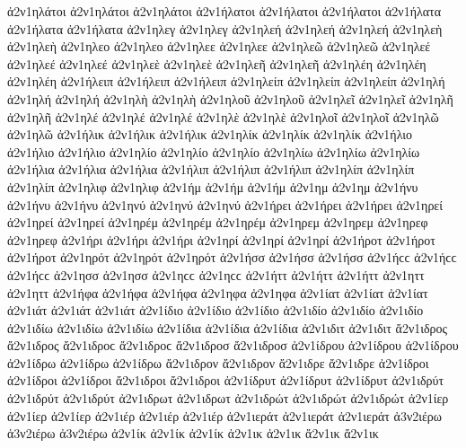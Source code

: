 {ἀ2ν1ηλάτοι ἀ2ν1ηλάτοι ἀ2ν1ηλάτοι 
ἀ2ν1ήλατοι ἀ2ν1ήλατοι ἀ2ν1ήλατοι 
ἀ2ν1ήλατα ἀ2ν1ήλατα ἀ2ν1ήλατα 
ἀ2ν1ηλεγ ἀ2ν1ηλεγ   %
ἀ2ν1ηλεή ἀ2ν1ηλεή ἀ2ν1ηλεή   %
ἀ2ν1ηλεὴ ἀ2ν1ηλεὴ 
ἀ2ν1ηλεο ἀ2ν1ηλεο 
ἀ2ν1ηλεε ἀ2ν1ηλεε 
ἀ2ν1ηλεῶ ἀ2ν1ηλεῶ 
ἀ2ν1ηλεέ ἀ2ν1ηλεέ ἀ2ν1ηλεέ 
ἀ2ν1ηλεὲ ἀ2ν1ηλεὲ 
ἀ2ν1ηλεῆ ἀ2ν1ηλεῆ 
ἀ2ν1ηλέη ἀ2ν1ηλέη ἀ2ν1ηλέη   %
ἀ2ν1ήλειπ ἀ2ν1ήλειπ ἀ2ν1ήλειπ   %
ἀ2ν1ηλείπ ἀ2ν1ηλείπ ἀ2ν1ηλείπ 
ἀ2ν1ηλή ἀ2ν1ηλή ἀ2ν1ηλή   %
ἀ2ν1ηλὴ ἀ2ν1ηλὴ 
ἀ2ν1ηλοῦ ἀ2ν1ηλοῦ 
ἀ2ν1ηλεῖ ἀ2ν1ηλεῖ 
ἀ2ν1ηλῆ ἀ2ν1ηλῆ 
ἀ2ν1ηλέ ἀ2ν1ηλέ ἀ2ν1ηλέ 
ἀ2ν1ηλὲ ἀ2ν1ηλὲ 
ἀ2ν1ηλοῖ ἀ2ν1ηλοῖ 
ἀ2ν1ηλῶ ἀ2ν1ηλῶ 
ἀ2ν1ήλικ ἀ2ν1ήλικ ἀ2ν1ήλικ   %
ἀ2ν1ηλίκ ἀ2ν1ηλίκ ἀ2ν1ηλίκ 
ἀ2ν1ήλιο ἀ2ν1ήλιο ἀ2ν1ήλιο   %
ἀ2ν1ηλίο ἀ2ν1ηλίο ἀ2ν1ηλίο 
ἀ2ν1ηλίω ἀ2ν1ηλίω ἀ2ν1ηλίω 
ἀ2ν1ήλια ἀ2ν1ήλια ἀ2ν1ήλια 
ἀ2ν1ήλιπ ἀ2ν1ήλιπ ἀ2ν1ήλιπ   %
ἀ2ν1ηλίπ ἀ2ν1ηλίπ ἀ2ν1ηλίπ 
ἀ2ν1ηλιφ ἀ2ν1ηλιφ   %
ἀ2ν1ήμ ἀ2ν1ήμ ἀ2ν1ήμ   %
ἀ2ν1ημ ἀ2ν1ημ 
ἀ2ν1ήνυ ἀ2ν1ήνυ ἀ2ν1ήνυ   %
ἀ2ν1ηνύ ἀ2ν1ηνύ ἀ2ν1ηνύ 
ἀ2ν1ήρει ἀ2ν1ήρει ἀ2ν1ήρει   %
ἀ2ν1ηρεί ἀ2ν1ηρεί ἀ2ν1ηρεί 
ἀ2ν1ηρέμ ἀ2ν1ηρέμ ἀ2ν1ηρέμ   %
ἀ2ν1ηρεμ ἀ2ν1ηρεμ 
ἀ2ν1ηρεφ ἀ2ν1ηρεφ   %
ἀ2ν1ήρι ἀ2ν1ήρι ἀ2ν1ήρι   %
ἀ2ν1ηρί ἀ2ν1ηρί ἀ2ν1ηρί 
ἀ2ν1ήροτ ἀ2ν1ήροτ ἀ2ν1ήροτ   %
ἀ2ν1ηρότ ἀ2ν1ηρότ ἀ2ν1ηρότ 
ἀ2ν1ήσσ ἀ2ν1ήσσ ἀ2ν1ήσσ ἀ2ν1ήϲϲ ἀ2ν1ήϲϲ ἀ2ν1ήϲϲ   %
ἀ2ν1ησσ ἀ2ν1ησσ ἀ2ν1ηϲϲ ἀ2ν1ηϲϲ 
ἀ2ν1ήττ ἀ2ν1ήττ ἀ2ν1ήττ   %
ἀ2ν1ηττ ἀ2ν1ηττ 
ἀ2ν1ήφα ἀ2ν1ήφα ἀ2ν1ήφα   %
ἀ2ν1ηφα ἀ2ν1ηφα 
ἀ2ν1ίατ ἀ2ν1ίατ ἀ2ν1ίατ   %
ἀ2ν1ιάτ ἀ2ν1ιάτ ἀ2ν1ιάτ 
ἀ2ν1ίδιο ἀ2ν1ίδιο ἀ2ν1ίδιο   %
ἀ2ν1ιδίο ἀ2ν1ιδίο ἀ2ν1ιδίο 
ἀ2ν1ιδίω ἀ2ν1ιδίω ἀ2ν1ιδίω 
ἀ2ν1ίδια ἀ2ν1ίδια ἀ2ν1ίδια 
ἀ2ν1ιδιτ ἀ2ν1ιδιτ   %
ἄ2ν1ιδρος ἄ2ν1ιδρος ἄ2ν1ιδροϲ ἄ2ν1ιδροϲ   %
ἄ2ν1ιδροσ ἄ2ν1ιδροσ 
ἀ2ν1ίδρου ἀ2ν1ίδρου ἀ2ν1ίδρου 
ἀ2ν1ίδρω ἀ2ν1ίδρω ἀ2ν1ίδρω 
ἄ2ν1ιδρον ἄ2ν1ιδρον 
ἄ2ν1ιδρε ἄ2ν1ιδρε 
ἀ2ν1ίδροι ἀ2ν1ίδροι ἀ2ν1ίδροι 
ἄ2ν1ιδροι ἄ2ν1ιδροι 
ἀ2ν1ίδρυτ ἀ2ν1ίδρυτ ἀ2ν1ίδρυτ   %
ἀ2ν1ιδρύτ ἀ2ν1ιδρύτ ἀ2ν1ιδρύτ 
ἀ2ν1ιδρωτ ἀ2ν1ιδρωτ   %
ἀ2ν1ιδρώτ ἀ2ν1ιδρώτ ἀ2ν1ιδρώτ   %
ἀ2ν1ίερ ἀ2ν1ίερ ἀ2ν1ίερ   %
ἀ2ν1ιέρ ἀ2ν1ιέρ ἀ2ν1ιέρ 
ἀ2ν1ιεράτ ἀ2ν1ιεράτ ἀ2ν1ιεράτ   %
ἀ3ν2ιέρω ἀ3ν2ιέρω ἀ3ν2ιέρω   %
ἀ2ν1ίκ ἀ2ν1ίκ ἀ2ν1ίκ   %
ἀ2ν1ικ ἀ2ν1ικ 
ἄ2ν1ικ ἄ2ν1ικ   %
}
